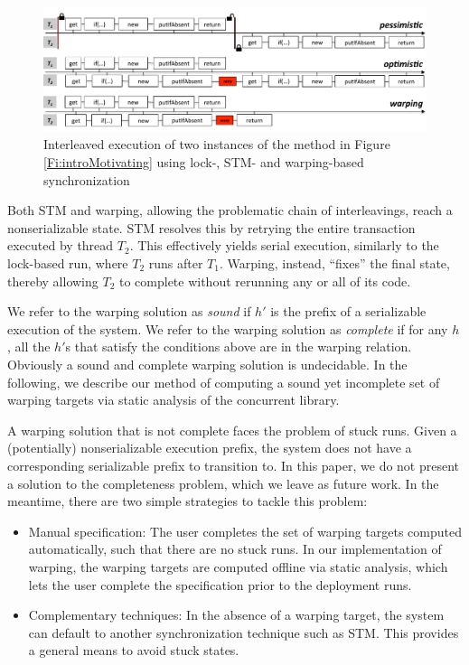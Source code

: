 \begin{figure}
	\begin{center}
	\includegraphics[width=\textwidth]{OverviewSlide.pdf}
	\end{center}
	\caption{\label{Fi:motivatingOverview}Interleaved execution of two instances of the method in Figure \ref{Fi:introMotivating} using lock-, STM- and warping-based synchronization}
\end{figure}

Both STM and warping, allowing the problematic chain of interleavings, reach a nonserializable state. STM resolves this by retrying the entire transaction executed by thread $T_2$. This effectively yields serial execution, similarly to the lock-based run, where $T_2$ runs after $T_1$. Warping, instead, ``fixes'' the final state, thereby allowing $T_2$ to complete without rerunning any or all of its code.

We refer to the warping solution as \emph{sound} if $h'$ is the prefix of a serializable execution of the system. We refer to the warping solution as \emph{complete} if for any $h$, all the $h'$s that satisfy the conditions above are in the warping relation. Obviously a sound and complete warping solution is undecidable. In the following, we describe our method of computing a sound yet incomplete set of warping targets via static analysis of the concurrent library.

A warping solution that is not complete faces the problem of stuck runs. Given a (potentially) nonserializable execution prefix, the system does not have a corresponding serializable prefix to transition to. In this paper, we do not present a solution to the completeness problem, which we leave as future work. In the meantime, there are two simple strategies to tackle this problem:
\begin{itemize}
	\item Manual specification: The user completes the set of warping targets computed automatically, such that there are no stuck runs. In our implementation of warping, the warping targets are computed offline via static analysis, which lets the user complete the specification prior to the deployment runs.
	\item Complementary techniques: In the absence of a warping target, the system can default to another synchronization technique such as STM. This provides a general means to avoid stuck states.
\end{itemize}


